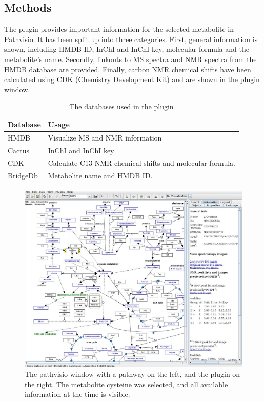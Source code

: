 \documentclass{bioinfo}
\begin{document}
\begin{methods}
\section{Methods}


The plugin provides important information for the selected metabolite in Pathvisio. It has been split up into three categories. First, general information is shown, including HMDB ID, InChI and InChI key, molecular formula and the metabolite's name. Secondly, linkouts to MS spectra and NMR spectra from the HMDB database are provided. Finally, carbon NMR chemical shifts have been calculated using CDK (Chemistry Development Kit) and are shown in the plugin window.

\begin{table}[ht]
\caption{The databases used in the plugin}
\centering  %
\begin{tabular}{p{1cm}p{7cm}}
\hline\hline   
Database & Usage \\ [0.5ex] 
\hline         
HMDB & Visualize MS and NMR information\\
Cactus & InChI and InChI key\\
CDK & Calculate C13 NMR chemical shifts and molecular formula.\\
BridgeDb & Metabolite name and HMDB ID. \\ [1ex] 
\hline 
\end{tabular}
\end{table}

\end{methods}

\begin{figure}[!tpb]%
\centerline{\includegraphics[width=18cm]{figure1.png}}
\caption{The pathvisio window with a pathway on the left, and the plugin on the right. The metabolite cysteine was selected, and all available information at the time is visible.}\label{fig:01}
\end{figure}
\end{document}

